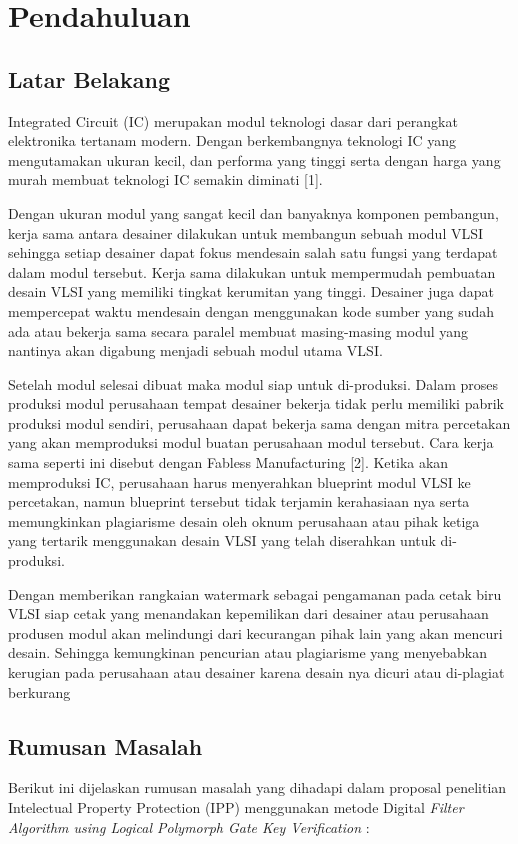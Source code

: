 \chapter{Pendahuluan}
\section{Latar Belakang}

Integrated Circuit (IC) merupakan modul teknologi dasar dari perangkat elektronika tertanam modern. Dengan berkembangnya teknologi IC yang mengutamakan ukuran kecil, dan performa yang tinggi serta dengan harga yang murah membuat teknologi IC semakin diminati [1].

Dengan ukuran modul yang sangat kecil dan banyaknya komponen
pembangun, kerja sama antara desainer dilakukan untuk membangun sebuah modul VLSI sehingga setiap desainer dapat fokus mendesain salah satu fungsi yang terdapat dalam modul tersebut. Kerja sama dilakukan untuk mempermudah pembuatan desain VLSI yang memiliki tingkat kerumitan yang tinggi. Desainer juga dapat mempercepat waktu mendesain dengan menggunakan kode sumber yang sudah ada atau bekerja sama secara paralel membuat masing-masing modul yang nantinya akan digabung menjadi sebuah modul utama VLSI.

Setelah modul selesai dibuat maka modul siap untuk di-produksi. Dalam proses produksi modul perusahaan tempat desainer bekerja tidak perlu memiliki pabrik produksi modul sendiri, perusahaan dapat bekerja sama dengan mitra percetakan yang akan memproduksi modul buatan perusahaan modul tersebut. Cara kerja sama seperti ini disebut dengan Fabless Manufacturing [2]. Ketika akan memproduksi IC, perusahaan harus menyerahkan blueprint modul VLSI ke percetakan, namun blueprint tersebut tidak terjamin kerahasiaan nya serta memungkinkan plagiarisme desain oleh oknum perusahaan atau pihak ketiga yang tertarik menggunakan desain VLSI yang telah diserahkan untuk di-produksi.

Dengan memberikan rangkaian watermark sebagai pengamanan pada cetak biru VLSI siap cetak yang menandakan kepemilikan dari desainer atau perusahaan produsen modul akan melindungi dari kecurangan pihak lain yang akan mencuri desain. Sehingga kemungkinan pencurian atau plagiarisme yang menyebabkan kerugian pada perusahaan atau desainer karena desain nya dicuri atau di-plagiat berkurang

\section{Rumusan Masalah}
Berikut ini dijelaskan rumusan masalah yang dihadapi dalam proposal penelitian Intelectual Property Protection (IPP) menggunakan metode Digital \textit{Filter Algorithm using Logical Polymorph Gate Key Verification} :

